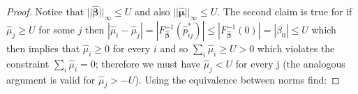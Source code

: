 \documentclass[twoside,11pt]{article}
\begin{document}
\begin{proof}
Notice  that $||\boldsymbol{\hat{\beta}}||_{\infty} \leq U$ and also  $||\boldsymbol{\hat{\mu}}||_{\infty} \leq U$. The second claim is true for if  $\hat{\mu}_j \geq U$ for some $j$ then $|\hat{\mu}_i -\hat{\mu}_j|= |F_{\boldsymbol{\hat \beta}}^{-1}(\hat{p}_{ij}^*)| \leq |F_{\boldsymbol{\hat \beta}}^{-1}(0)| = |\beta_0| \leq U $ which then implies that $\hat{\mu}_i\geq 0$ for every $i$ and so $\sum_i \hat{\mu}_i \geq U >0$ which violates the constraint $\sum_i \hat{\mu}_i = 0$; therefore we must have $\hat{\mu}_j < U$ for every j (the analogous argument is valid for $\hat{\mu}_j > -U$). Using the equivalence between norms find:


\end{proof}
\end{document}
